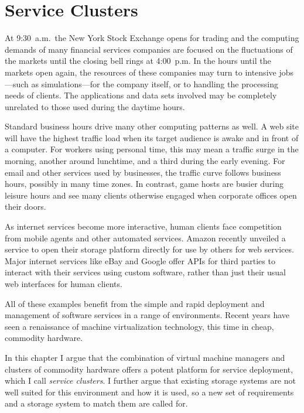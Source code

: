 \chapter{Service Clusters}

At 9:30~a.m.\ the New York Stock Exchange opens for trading and the computing demands of many financial services companies are focused on the fluctuations of the markets until the closing bell rings at 4:00~p.m. In the hours until the markets open again, the resources of these companies may turn to intensive jobs---such as simulations---for the company itself, or to handling the processing needs of clients. The applications and data sets involved may be completely unrelated to those used during the daytime hours.

Standard business hours drive many other computing patterns as well. A web site will have the highest traffic load when its target audience is awake and in front of a computer. For workers using personal time, this may mean a traffic surge in the morning, another around lunchtime, and a third during the early evening. For email and other services used by businesses, the traffic curve follows business hours, possibly in many time zones. In contrast, game hosts are busier during leisure hours and see many clients otherwise engaged when corporate offices open their doors.

As internet services become more interactive, human clients face competition from mobile agents and other automated services. Amazon recently unveiled a service to open their storage platform directly for use by others for web services. Major internet services like eBay and Google offer APIs for third parties to interact with their services using custom software, rather than just their usual web interfaces for human clients.

All of these examples benefit from the simple and rapid deployment and management of software services in a range of environments. Recent years have seen a renaissance of machine virtualization technology, this time in cheap, commodity hardware.

In this chapter I argue that the combination of virtual machine managers and clusters of commodity hardware offers a potent platform for service deployment, which I call \textit{service clusters}. I further argue that existing storage systems are not well suited for this environment and how it is used, so a new set of requirements and a storage system to match them are called for.